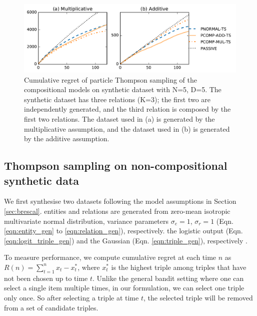 \begin{figure}[t]
	\centering
	\includegraphics[width=\linewidth]{images/toy_comp_5_2_5.pdf}
	\caption{\label{fig:comp_synthetic} Cumulative regret of particle Thompson sampling of the compositional models on synthetic dataset with N=5, D=5. The synthetic dataset has three relations (K=3); the first two are independently generated, and the third relation is composed by the first two relations. The dataset used in (a) is generated by the multiplicative assumption, and the dataset used in (b) is generated by the additive assumption.}
\end{figure}

\subsection{Thompson sampling on non-compositional synthetic data}

We first synthesise two datasets
following the model assumptions in Section \ref{sec:brescal}.
entities and relations are generated from zero-mean isotropic multivariate normal distribution, 
variance parameters $\sigma_e=1$, $\sigma_r=1$ (Eqn. \ref{eqn:entity_gen} to
\ref{eqn:relation_gen}), respectively.
 the logistic output (Eqn. \ref{eqn:logit_triple_gen}) and the Gaussian  (Eqn. \ref{eqn:triple_gen}), respectively .

To measure performance, we compute cumulative regret
at each time $n$ as $R(n) = \sum_{t=1}^{n} x_t - x^{*}_t$,
where $x^*_t$ is the highest triple among triples that have not been chosen up to time $t$. Unlike the general
bandit setting where one can select a single item multiple times, in our formulation, we can select one triple
only once. So after selecting a triple at time $t$, the selected triple will be removed from a set of candidate
triples.


